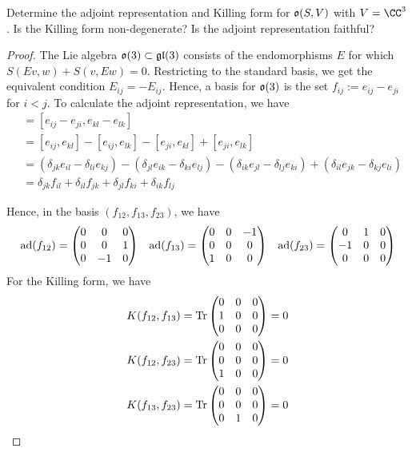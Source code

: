\documentclass{article}
\begin{document}
 Determine the adjoint representation and Killing form for $\mathfrak o(S,V)$ with $V=\CC^3$.  Is the Killing form non-degenerate?  Is the adjoint representation faithful? 
\begin{proof}
The Lie algebra $\mathfrak o(3) \subset \mathfrak{gl}(3)$ consists of the endomorphisms $E$ for which $S(Ev,w) + S(v,Ew) = 0$.  Restricting to the standard basis, we get the equivalent condition $E_{ij} = - E_{ij}$.  Hence, a basis for $\mathfrak o(3)$ is the set $f_{ij} := e_{ij} - e_{ji}$ for $i < j$.  To calculate the adjoint representation, we have
\begin{align*}
[f_{ij}, f_{kl}] & = [e_{ij} - e_{ji}, e_{kl} - e_{lk}] \\
& = [e_{ij}, e_{kl}] - [e_{ij}, e_{lk}] - [e_{ji}, e_{kl}] + [e_{ji}, e_{lk}] \\
& = (\delta_{jk} e_{il} - \delta_{li}e_{kj}) - (\delta_{jl} e_{ik} - \delta_{ki}e_{lj}) - (\delta_{ik} e_{jl} - \delta_{lj}e_{ki }) + (\delta_{il} e_{jk} - \delta_{kj}e_{li }) \\
& = \delta_{jk} f_{il} + \delta_{il} f_{jk} + \delta_{jl} f_{ki} + \delta_{ik} f_{lj}
\end{align*}

Hence, in the basis $(f_{12}, f_{13}, f_{23})$, we have
$$
\begin{array}{ccc}
\operatorname{ad}(f_{12}) = \begin{pmatrix} 
0  &  0 & 0  \\ 
0  &  0 & 1  \\
0  & -1 & 0
\end{pmatrix}
&
\operatorname{ad}(f_{13}) = \begin{pmatrix} 
 0 &  0 & -1  \\ 
 0 &  0 &  0  \\
 1 &  0 &  0
\end{pmatrix}
&
\operatorname{ad}(f_{23}) = \begin{pmatrix} 
  0 &  1 &  0  \\ 
 -1 &  0 &  0  \\
  0 &  0 &  0
\end{pmatrix}
\end{array}
$$
For the Killing form, we have
\begin{align*}
K(f_{12}, f_{13}) & = \operatorname{Tr} 
\begin{pmatrix} 
  0 &  0 &  0  \\ 
  1 &  0 &  0  \\
  0 &  0 &  0
\end{pmatrix}
 = 0
\\
K(f_{12}, f_{23}) & = \operatorname{Tr} 
\begin{pmatrix} 
  0 &  0 &  0  \\ 
  0 &  0 &  0  \\
  1 &  0 &  0
\end{pmatrix}
 = 0
\\
K(f_{13}, f_{23}) & = \operatorname{Tr} 
\begin{pmatrix} 
  0 &  0 &  0  \\ 
  0 &  0 &  0  \\
  0 &  1 &  0
\end{pmatrix}
 = 0
\end{align*}


\end{proof}
\end{document}
